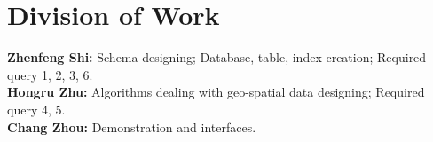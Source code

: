 \documentclass[final,1p,times]{elsarticle}
\begin{document}
\section{Division of Work}
\textbf{Zhenfeng Shi:} Schema designing; Database, table, index creation; Required query 1, 2, 3, 6.\\

\textbf{Hongru Zhu:} Algorithms dealing with geo-spatial data designing; Required query 4, 5.\\

\textbf{Chang Zhou:} Demonstration and interfaces.















\end{document}
